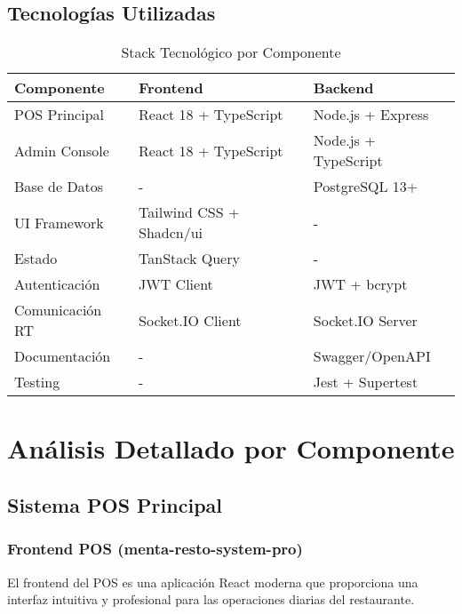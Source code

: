 \documentclass[12pt,a4paper]{article}
\begin{document}
\subsection{Tecnologías Utilizadas}

\begin{table}[H]
\centering
\begin{tabular}{@{}lll@{}}
\toprule
\textbf{Componente} & \textbf{Frontend} & \textbf{Backend} \\
\midrule
POS Principal & React 18 + TypeScript & Node.js + Express \\
Admin Console & React 18 + TypeScript & Node.js + TypeScript \\
Base de Datos & - & PostgreSQL 13+ \\
UI Framework & Tailwind CSS + Shadcn/ui & - \\
Estado & TanStack Query & - \\
Autenticación & JWT Client & JWT + bcrypt \\
Comunicación RT & Socket.IO Client & Socket.IO Server \\
Documentación & - & Swagger/OpenAPI \\
Testing & - & Jest + Supertest \\
\bottomrule
\end{tabular}
\caption{Stack Tecnológico por Componente}
\end{table}

\section{Análisis Detallado por Componente}

\subsection{Sistema POS Principal}

\subsubsection{Frontend POS (menta-resto-system-pro)}

El frontend del POS es una aplicación React moderna que proporciona una interfaz intuitiva y profesional para las operaciones diarias del restaurante.
\end{document}
